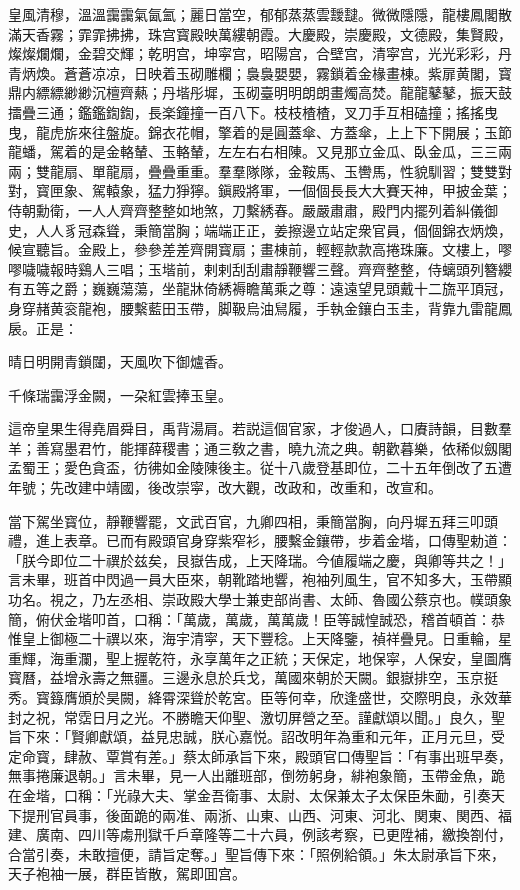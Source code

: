 \begin{myquote}
皇風清穆，溫溫靄靄氣氤氳；麗日當空，郁郁蒸蒸雲靉靆。微微隱隱，龍樓鳳閣散滿天香霧；霏霏拂拂，珠宫寳殿映萬縷朝霞。大慶殿，崇慶殿，文德殿，集賢殿，燦燦爛爛，金碧交輝；乾明宫，坤寜宫，昭陽宫，合壁宫，清寜宫，光光彩彩，丹青炳煥。蒼蒼凉凉，日映着玉砌雕欄；裊裊嬰嬰，霧鎖着金椽畫棟。紫扉黄閣，寳鼎内縹縹緲緲沉檀齊爇；丹堦彤墀，玉砌臺明明朗朗畫燭高焚。龍龍鼕鼕，振天鼓擂疊三通；鑑鑑鍧鍧，長楽鐘撞一百八下。枝枝楂楂，叉刀手互相磕撞；搖搖曳曳，龍虎旂來往盤旋。錦衣花帽，擎着的是圓蓋傘、方蓋傘，上上下下開展；玉節龍蟠，駕着的是金輅輦、玉輅輦，左左右右相陳。又見那立金瓜、臥金瓜，三三兩兩；雙龍扇、單龍扇，疊疊重重。羣羣隊隊，金鞍馬、玉轡馬，性貌馴習；雙雙對對，寳匣象、駕轅象，猛力猙獰。鎭殿將軍，一個個長長大大賽天神，甲披金葉；侍朝勳衛，一人人齊齊整整如地煞，刀繫綉春。嚴嚴肅肅，殿門内擺列着糾儀御史，人人豸冠森聳，秉簡當胸；端端正正，姜擦邊立站定衆官員，個個錦衣炳煥，候宣聽旨。金殿上，參參差差齊開寳扇；畫棟前，輕輕款款高捲珠廉。文樓上，嘐嘐噦噦報時鷄人三唱；玉堦前，剌剌刮刮肅靜鞭響三聲。齊齊整整，侍螭頭列簪纓有五等之爵；巍巍蕩蕩，坐龍牀倚綉褥瞻萬乘之尊：遠遠望見頭戴十二旒平頂冠，身穿赭黄衮龍袍，腰繫藍田玉帶，脚靸烏油舃履，手執金鑲白玉圭，背靠九雷龍鳳扆。正是：

晴日明開青鎖闥，天風吹下御爐香。

千條瑞靄浮金闕，一朶紅雲捧玉皇。
\end{myquote}

這帝皇果生得堯眉舜目，禹背湯肩。若説這個官家，才俊過人，口賡詩韻，目數羣羊；善寫墨君竹，能揮薛稷書；通三敎之書，曉九流之典。朝歡暮樂，依稀似劔閣孟蜀王；愛色貪盃，彷彿如金陵陳後主。従十八歲登基即位，二十五年倒改了五遭年號；先改建中靖國，後改崇寜，改大觀，改政和，改重和，改宣和。

當下駕坐寳位，靜鞭響罷，文武百官，九卿四相，秉簡當胸，向丹墀五拜三叩頭禮，進上表章。已而有殿頭官身穿紫窄衫，腰繫金鑲帶，步着金堦，口傳聖勅道：「朕今即位二十禩於兹矣，艮嶽告成，上天降瑞。今値履端之慶，與卿等共之！」言未畢，班首中閃過一員大臣來，朝靴踏地響，袍袖列風生，官不知多大，玉帶顯功名。視之，乃左丞相、崇政殿大學士兼吏部尚書、太師、魯國公蔡京也。幞頭象簡，俯伏金堦叩首，口稱：「萬歲，萬歲，萬萬歲！臣等誠惶誠恐，稽首頓首：恭惟皇上御極二十禩以來，海宇清寜，天下豐稔。上天降鑒，禎祥疊見。日重輪，星重輝，海重瀾，聖上握乾符，永享萬年之正統；天保定，地保寜，人保安，皇圖膺寳曆，益增永壽之無疆。三邊永息於兵戈，萬國來朝於天闕。銀嶽排空，玉京挺秀。寳籙膺頒於昊闕，絳霄深聳於乾宮。臣等何幸，欣逢盛世，交際明良，永效華封之祝，常霑日月之光。不勝瞻天仰聖、激切屏營之至。謹獻頌以聞。」良久，聖旨下來：「賢卿獻頌，益見忠誠，朕心嘉悦。詔改明年為重和元年，正月元旦，受定命寳，肆赦、覃賞有差。」蔡太師承旨下來，殿頭官口傳聖旨：「有事出班早奏，無事捲廉退朝。」言未畢，見一人出離班部，倒笏躬身，緋袍象簡，玉帶金魚，跪在金堦，口稱：「光祿大夫、掌金吾衛事、太尉、太保兼太子太保臣朱勔，引奏天下提刑官員事，後面跪的兩准、兩浙、山東、山西、河東、河北、関東、関西、福建、廣南、四川等䖏刑獄千戶章隆等二十六員，例該考察，已更陞補，繳換劄付，合當引奏，未敢擅便，請旨定奪。」聖旨傳下來：「照例給領。」朱太尉承旨下來，天子袍袖一展，群臣皆散，駕即囬宫。


